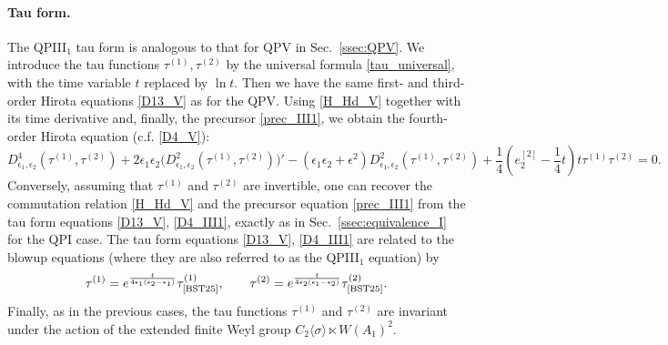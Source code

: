 \documentclass[12pt,a4paper]{article}
\numberwithin{equation}{section}
\begin{document}
\paragraph{Tau form.}
The QPIII$_1$ tau form is analogous to that for QPV in Sec.~\ref{ssec:QPV}. We introduce the tau functions $\tau^{(1)},\tau^{(2)}$ by the universal formula \eqref{tau_universal}, with the time variable $t$ replaced by $\ln t$. Then we have the same first- and third-order Hirota equations \eqref{D13_V} as for the QPV. Using \eqref{H_Hd_V} together with its time derivative and, finally, the precursor \eqref{prec_III1}, we obtain the fourth-order Hirota equation (c.f. \eqref{D4_V}):
\begin{equation}\label{D4_III1}
D^4_{\epsilon_1,\epsilon_2}\left(\tau^{(1)},\tau^{(2)}\right)+2\epsilon_1\epsilon_2\big(D^2_{\epsilon_1,\epsilon_2}\left(\tau^{(1)},\tau^{(2)}\right)\big)'-(\epsilon_1\epsilon_2{+}\epsilon^2)D^2_{\epsilon_1,\epsilon_2}\left(\tau^{(1)},\tau^{(2)}\right)+\frac14\left(e_2^{[2]}{-}\frac14t\right)t\tau^{(1)}\tau^{(2)}=0.
\end{equation}
Conversely, assuming that $\tau^{(1)}$ and $\tau^{(2)}$ are invertible, one can recover the commutation relation \eqref{H_Hd_V} and the precursor equation \eqref{prec_III1} from the tau form equations \eqref{D13_V}, \eqref{D4_III1}, exactly as in Sec.~\ref{ssec:equivalence_I} for the QPI case. 
The tau form equations \eqref{D13_V}, \eqref{D4_III1} are related to the blowup equations \cite[(3.1),(3.4)]{BST25} (where they are also referred to as the QPIII$_1$ equation) by 
\begin{equation}\label{conn_III1}
\tau^{(1)}=e^{\frac{t}{4\epsilon_1(\epsilon_2{-}\epsilon_1)}}\tau^{(1)}_{\textrm{\cite{BST25}}}, \qquad \tau^{(2)}=e^{\frac{t}{4\epsilon_2(\epsilon_1{-}\epsilon_2)}}\tau^{(2)}_{\textrm{\cite{BST25}}}.    
\end{equation}
Finally, as in the previous cases, the tau functions $\tau^{(1)}$ and $\tau^{(2)}$ are invariant under the action of the extended finite Weyl group $C_2\langle\sigma\rangle\ltimes W(A_1)^2$.
\end{document}
